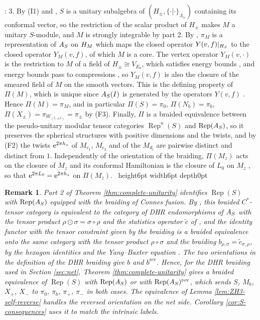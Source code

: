 \documentclass[leqno]{article}
\let\cal\relax
\newcommand{\cal}{\mathcal}
\newcommand{\qed}{\hfill \vrule height6pt  width6pt depth0pt}
\let\i\relax
\newcommand{\i}{\mathrm{i}}
\newcommand{\e}{\mathrm{e}}
\DeclareMathOperator{\Rep}{Rep}
\newtheorem{remark}[thm]{Remark}
\newenvironment{proof}[1][]{\noindent {\it Proof #1} : }{\hbox{~}\qed
\smallskip
}
\numberwithin{equation}{section}
\begin{document}
\begin{proof}
3. By (I1) and \cite[Theorem 4.5]{ArhII}, $S$ is a unitary subalgebra of $(H_\pm,\{\cdot|\cdot\}_{\Lambda_\pm})$ containing its conformal vector, so the restriction of the scalar product of $H_\pm$ makes $M$ a unitary $S$-module, and $M$ is strongly integrable by part 2. By \cite[Lemma 4.7(1)]{ArhII}, $\pi_M$ is a representation of $\cal A_S$ on $\cal H_M$ which maps the closed operator $Y(v,f)|_{\cal H_S}$ to the closed operator $Y_M(v,f)$, of which $M$ is a core. The vertex operator $Y_M(v,\cdot)$ is the restriction to $M$ of a field of $H_\pm \cong V_{E_8}$, which satisfies energy bounds \cite[Theorem 3.46]{Gui26}, and energy bounds pass to compressions \cite[Proposition 3.31 p.~50]{Gui26}, so $Y_M(v,f)$ is also the closure of the smeared field of $M$ on the smooth vectors. This is the defining property of $\Pi(M)$, which is unique since $\cal A_S(I)$ is generated by the operators $Y(v,f)$ \cite[(3.8) p.~41]{Gui26}. Hence $\Pi(M) = \pi_M$, and in particular $\Pi(S) = \pi_0$, $\Pi(N_b) = \pi_b$, $\Pi(X_\pm) = \pi_{W_{(1,\pm1)}} = \pi_\pm$ by (F3). Finally, $\Pi$ is a braided equivalence between the pseudo-unitary modular tensor categories $\Rep^u(S)$ and $\Rep(\cal A_S)$, so it preserves the spherical structures with positive dimensions \cite[Proposition 8.23 p.~34]{ENO05} and the twists, and by (F2) the twists $\e^{2\pi\i h_z}$ of $M_{c_1}$, $M_{c_2}$ and of the $M_{d_l}$ are pairwise distinct and distinct from $1$. Independently of the orientation of the braiding, $\Pi(M_z)$ acts on the closure of $M_z$ and its conformal Hamiltonian is the closure of $L_0$ on $M_z$ \cite[Remark 4.23 p.~43]{Gui25}, so that $\e^{2\pi\i L_0} = \e^{2\pi\i h_z}$ on $\Pi(M_z)$.
\end{proof}

\begin{remark}\normalfont
\label{rem:braiding-conventions}
Part 2 of Theorem \ref{thm:complete-unitarity} identifies $\Rep(S)$ with $\Rep(\cal A_S)$ equipped with the braiding of Connes fusion. By \cite[Theorem 6.6 p.~77]{Gui21a}, this braided $C^*$-tensor category is equivalent to the category of DHR endomorphisms of $\cal A_S$ with the tensor product $\rho \odot \sigma = \sigma \circ \rho$ and the statistics operator $\widetilde c$ of \cite[(6.1) p.~73]{Gui21a}, and the identity functor with the tensor constraint given by the braiding is a braided equivalence onto the same category with the tensor product $\rho \circ \sigma$ and the braiding $b_{\rho,\sigma} = \widetilde c_{\sigma,\rho}$, by the hexagon identities and the Yang--Baxter equation \cite[proof of Theorem 7.17(3)]{ArhII}. The two orientations in the definition of the DHR braiding give $b$ and $b^{\mathrm{rev}}$. Hence, for the DHR braiding used in Section \ref{sec:net}, Theorem \ref{thm:complete-unitarity} gives a braided equivalence of $\Rep(S)$ with $\Rep(\cal A_S)$ or with $\Rep(\cal A_S)^{\mathrm{rev}}$, which sends $S$, $M_b$, $X_+$, $X_-$ to $\pi_0$, $\pi_b$, $\pi_+$, $\pi_-$ in both cases. The equivalence of Lemma \ref{lem:ZH3-self-reverse} handles the reversed orientation on the net side. Corollary \ref{cor:S-consequences} uses it to match the intrinsic labels.
\end{remark}
\end{document}
